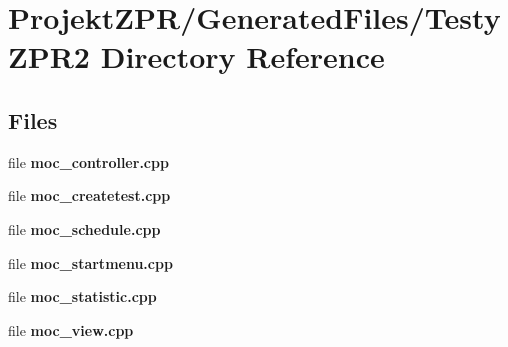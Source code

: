 \section{Projekt\-Z\-P\-R/\-Generated\-Files/\-Testy\-Z\-P\-R2 Directory Reference}
\label{dir_017ccfcff19280d68634d6f25622afec}
\subsection*{Files}
\begin{DoxyCompactItemize}
\item 
file {\bf moc\-\_\-controller.\-cpp}
\item 
file {\bf moc\-\_\-createtest.\-cpp}
\item 
file {\bf moc\-\_\-schedule.\-cpp}
\item 
file {\bf moc\-\_\-startmenu.\-cpp}
\item 
file {\bf moc\-\_\-statistic.\-cpp}
\item 
file {\bf moc\-\_\-view.\-cpp}
\end{DoxyCompactItemize}
